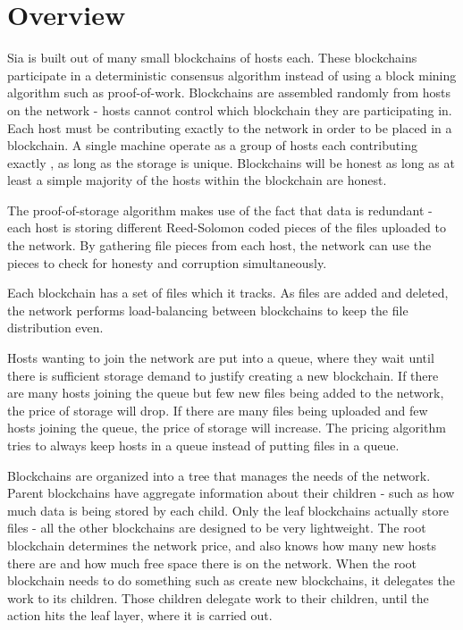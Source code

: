 \documentclass[twocolumn]{article}
\begin{document}

\section{Overview}

Sia is built out of many small blockchains of \numhosts{} hosts each.
These blockchains participate in a deterministic consensus algorithm instead of using a block mining algorithm such as proof-of-work.
Blockchains are assembled randomly from hosts on the network - hosts cannot control which blockchain they are participating in.
Each host must be contributing exactly \storageperhost{} to the network in order to be placed in a blockchain.
A single machine operate as a group of hosts each contributing exactly \storageperhost{}, as long as the storage is unique.
Blockchains will be honest as long as at least a simple majority of the hosts within the blockchain are honest.

The proof-of-storage algorithm makes use of the fact that data is redundant - each host is storing different Reed-Solomon coded pieces of the files uploaded to the network.
By gathering file pieces from each host, the network can use the pieces to check for honesty and corruption simultaneously.

Each blockchain has a set of files which it tracks.
As files are added and deleted, the network performs load-balancing between blockchains to keep the file distribution even.

Hosts wanting to join the network are put into a queue, where they wait until there is sufficient storage demand to justify creating a new blockchain.
If there are many hosts joining the queue but few new files being added to the network, the price of storage will drop.
If there are many files being uploaded and few hosts joining the queue, the price of storage will increase.
The pricing algorithm tries to always keep hosts in a queue instead of putting files in a queue.

Blockchains are organized into a tree that manages the needs of the network.
Parent blockchains have aggregate information about their children - such as how much data is being stored by each child.
Only the leaf blockchains actually store files - all the other blockchains are designed to be very lightweight.
The root blockchain determines the network price, and also knows how many new hosts there are and how much free space there is on the network.
When the root blockchain needs to do something such as create new blockchains, it delegates the work to its children.
Those children delegate work to their children, until the action hits the leaf layer, where it is carried out.
\end{document}
